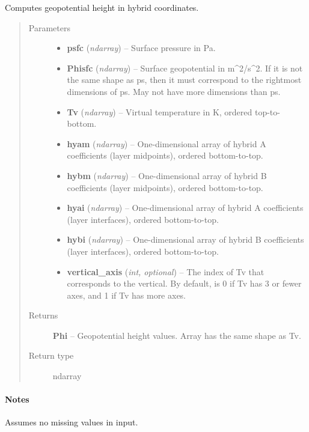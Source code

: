 \documentclass[letterpaper,10pt,english]{sphinxmanual}
\begin{document}
\begin{fulllineitems}
\label{atmos:atmos.util.geopotential_height_hybrid}
Computes geopotential height in hybrid coordinates.
\begin{quote}\begin{description}
\item[{Parameters}] \leavevmode\begin{itemize}
\item {} 
\textbf{psfc} (\emph{ndarray}) -- Surface pressure in Pa.

\item {} 
\textbf{Phisfc} (\emph{ndarray}) -- Surface geopotential in m\textasciicircum{}2/s\textasciicircum{}2. If it is not the same shape as ps,
then it must correspond to the rightmost dimensions of ps. May not have
more dimensions than ps.

\item {} 
\textbf{Tv} (\emph{ndarray}) -- Virtual temperature in K, ordered top-to-bottom.

\item {} 
\textbf{hyam} (\emph{ndarray}) -- One-dimensional array of hybrid A coefficients (layer midpoints),
ordered bottom-to-top.

\item {} 
\textbf{hybm} (\emph{ndarray}) -- One-dimensional array of hybrid B coefficients (layer midpoints),
ordered bottom-to-top.

\item {} 
\textbf{hyai} (\emph{ndarray}) -- One-dimensional array of hybrid A coefficients (layer interfaces),
ordered bottom-to-top.

\item {} 
\textbf{hybi} (\emph{ndarray}) -- One-dimensional array of hybrid B coefficients (layer interfaces),
ordered bottom-to-top.

\item {} 
\textbf{vertical\_axis} (\emph{int, optional}) -- The index of Tv that corresponds to the vertical. By default, is 0 if
Tv has 3 or fewer axes, and 1 if Tv has more axes.

\end{itemize}

\item[{Returns}] \leavevmode
\textbf{Phi} --
Geopotential height values. Array has the same shape as Tv.

\item[{Return type}] \leavevmode
ndarray

\end{description}\end{quote}
\paragraph{Notes}

Assumes no missing values in input.

\end{fulllineitems}
\end{document}
